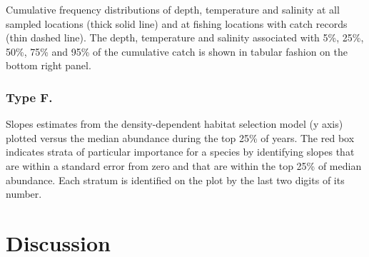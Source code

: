 \documentclass[12pt]{article}\usepackage[]{graphicx}\usepackage[]{color}
\begin{document}
Cumulative frequency distributions of depth, temperature and salinity at all sampled locations (thick solid line) and at fishing locations with catch records (thin dashed line). The depth, temperature and salinity associated with 5\%, 25\%, 50\%, 75\% and 95\% of the cumulative catch is shown in tabular fashion on the bottom right panel.

\subsubsection{Type F.}\label{type-f.}

Slopes estimates from the density-dependent habitat selection model (y axis) plotted versus the median abundance during the top 25\% of years. The red box indicates strata of particular importance for a species by identifying slopes that are within a standard error from zero and that are within the top 25\% of median abundance. Each stratum is identified on the plot by the last two digits of its number.

\section{Discussion}\label{discussion}
\end{document}
